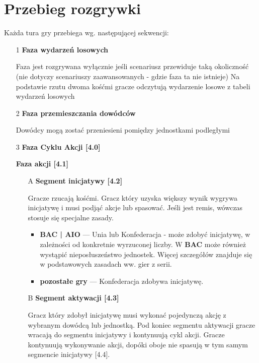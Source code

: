 \section{Przebieg rozgrywki}
Każda tura gry przebiega wg. następującej sekwencji:
\begin{itemize}
  \item[1] \textbf{Faza wydarzeń losowych}\par
        Faza jest rozgrywana wyłącznie jeśli scenariusz przewiduje taką okoliczność (nie dotyczy scenariuszy zaawansowanych - gdzie faza ta nie istnieje)
        Na podstawie rzutu dwoma kośćmi gracze odczytują wydarzenie losowe z tabeli wydarzeń losowych
  \item[2] \textbf{Faza przemieszczania dowódców}\par
        Dowódcy mogą zostać przeniesieni pomiędzy jednostkami podległymi
  \item[3] \textbf{Faza Cyklu Akcji [4.0]}\par
        \textbf{Faza akcji [4.1]} \par
        \begin{itemize}
          \item[A] \textbf{Segment inicjatywy [4.2]}\par
                Gracze rzucają kośćmi. Gracz który uzyska większy wynik wygrywa inicjatywę i musi podjąć akcje lub spasować.
                Jeśli jest remis, wówczas stosuje się specjalne zasady.
                \begin{itemize}
                  \item \textbf{BAC | AIO} ---
                        Unia lub Konfederacja - może zdobyć inicjatywę, w zależności od konkretnie wyrzuconej liczby.
                        W \textbf{BAC} może również wystąpić nieposłuszeństwo jednostek.
                        Więcej szczegółów znajduje się w podstawowych zasadach ww. gier z serii.
                  \item \textbf{pozostałe gry} --- Konfederacja zdobywa inicjatywę.
                \end{itemize}
          \item[B] \textbf{Segment aktywacji [4.3]} \par
                Gracz który zdobył inicjatywę musi wykonać pojedynczą akcję z wybranym dowódcą lub jednostką.
                Pod koniec segmentu aktywacji gracze wracają do segmentu inicjatywy i kontynuują cykl akcji.
                Gracze kontynuują wykonywanie akcji, dopóki oboje nie spasują w tym samym segmencie inicjatywy [4.4].
                

\end{itemize}
\end{itemize}
